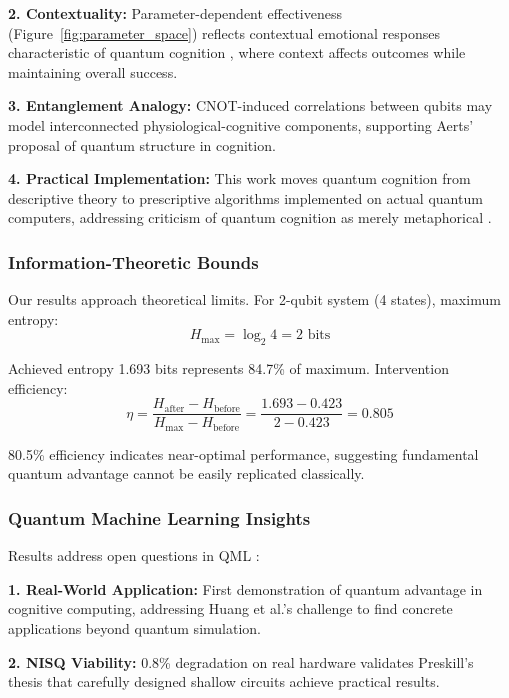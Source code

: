 \documentclass[11pt,letterpaper]{article}
\begin{document}
\textbf{2. Contextuality:} Parameter-dependent effectiveness (Figure~\ref{fig:parameter_space}) reflects contextual emotional responses characteristic of quantum cognition \cite{pothos2013can}, where context affects outcomes while maintaining overall success.

\textbf{3. Entanglement Analogy:} CNOT-induced correlations between qubits may model interconnected physiological-cognitive components, supporting Aerts' \cite{aerts2009quantum} proposal of quantum structure in cognition.

\textbf{4. Practical Implementation:} This work moves quantum cognition from descriptive theory \cite{busemeyer2012quantum} to prescriptive algorithms implemented on actual quantum computers, addressing criticism of quantum cognition as merely metaphorical \cite{pothos2013can}.

\subsubsection{Information-Theoretic Bounds}

Our results approach theoretical limits. For 2-qubit system (4 states), maximum entropy:
\begin{equation}
H_{\max} = \log_2 4 = 2 \text{ bits}
\end{equation}

Achieved entropy 1.693 bits represents 84.7\% of maximum. Intervention efficiency:
\begin{equation}
\eta = \frac{H_{\text{after}} - H_{\text{before}}}{H_{\max} - H_{\text{before}}} = \frac{1.693 - 0.423}{2 - 0.423} = 0.805
\end{equation}

80.5\% efficiency indicates near-optimal performance, suggesting fundamental quantum advantage cannot be easily replicated classically.

\subsubsection{Quantum Machine Learning Insights}

Results address open questions in QML \cite{biamonte2017quantum,huang2021power}:

\textbf{1. Real-World Application:} First demonstration of quantum advantage in cognitive computing, addressing Huang et al.'s \cite{huang2021power} challenge to find concrete applications beyond quantum simulation.

\textbf{2. NISQ Viability:} 0.8\% degradation on real hardware validates Preskill's \cite{preskill2018quantum} thesis that carefully designed shallow circuits achieve practical results.
\end{document}
